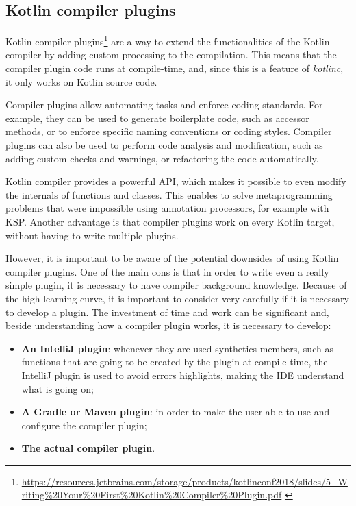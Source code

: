 \subsection{Kotlin compiler plugins}\label{section:compiler_plugin_explanation}
Kotlin compiler plugins\footnote{\url{https://resources.jetbrains.com/storage/products/kotlinconf2018/slides/5\_Writing\%20Your\%20First\%20Kotlin\%20Compiler\%20Plugin.pdf} \label{compiler_plugin_slides_footnote}} are a way to extend the functionalities of the Kotlin compiler by adding custom processing to the compilation. This means that the compiler plugin code runs at compile-time, and, since this is a feature of \textit{kotlinc}, it only works on Kotlin source code.

Compiler plugins allow automating tasks and enforce coding standards. For example, they can be used to generate boilerplate code, such as accessor methods, or to enforce specific naming conventions or coding styles. Compiler plugins can also be used to perform code analysis and modification, such as adding custom checks and warnings, or refactoring the code automatically.

Kotlin compiler provides a powerful API, which makes it possible to even modify the internals of functions and classes. This enables to solve metaprogramming problems that were impossible using annotation processors, for example with KSP. Another advantage is that compiler plugins work on every Kotlin target, without having to write multiple plugins.

However, it is important to be aware of the potential downsides of using Kotlin compiler plugins. One of the main cons is that in order to write even a really simple plugin, it is necessary to have compiler background knowledge. Because of the high learning curve, it is important to consider very carefully if it is necessary to develop a plugin. The investment of time and work can be significant and, beside understanding how a compiler plugin works, it is necessary to develop:
\begin{itemize}
    \item \textbf{An IntelliJ plugin}: whenever they are used synthetics members, such as functions that are going to be created by the plugin at compile time, the IntelliJ plugin is used to avoid errors highlights, making the IDE understand what is going on;
    \item \textbf{A Gradle or Maven plugin}: in order to make the user able to use and configure the compiler plugin;
    \item \textbf{The actual compiler plugin}.
\end{itemize}

